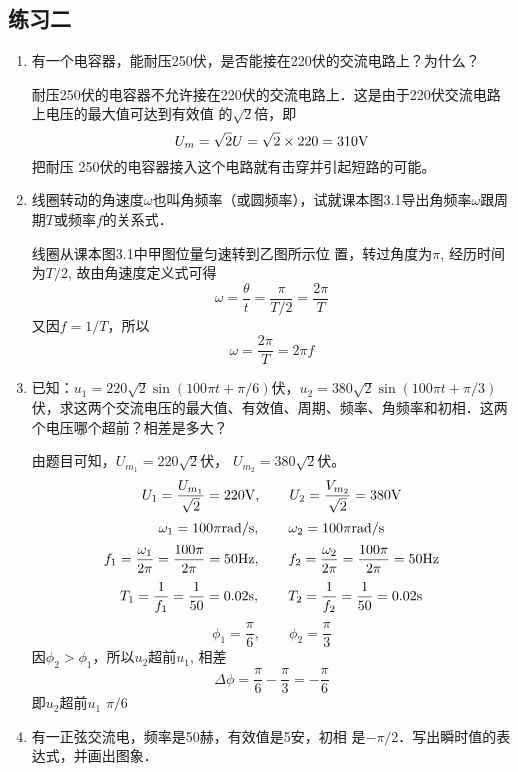 \subsection{练习二}
\begin{enumerate}
    \item 有一个电容器，能耐压250伏，是否能接在220伏的交流电路上？为什么？


    \begin{solution}
        耐压250伏的电容器不允许接在220伏的交流电路上．这是由于220伏交流电路上电压的最大值可达到有效值
        的$\sqrt{2}$倍，即
        \[U_m=\sqrt{2}U=\sqrt{2}\times220=310{\rm V}\]
        把耐压
        250伏的电容器接入这个电路就有击穿并引起短路的可能。
    \end{solution}
    
    \item 线圈转动的角速度$\omega$也叫角频率（或圆频率），试就课本图3.1导出角频率$\omega$跟周期$T$或频率$f$的关系式．


    \begin{solution}
        线圈从课本图3.1中甲图位量匀速转到乙图所示位
        置，转过角度为$\pi$, 经历时间为$T/2$, 故由角速度定义式可得
\[\omega=\frac{\theta}{t}=\frac{\pi}{T/2}=\frac{2\pi}{T}\]
又因$f=1/T$，所以
\[\omega=\frac{2\pi}{T}=2\pi f\]
    \end{solution}
    
    \item 已知：$u_1=220\sqrt{2}\sin(100\pi t+\pi /6)$伏，$u_2=380\sqrt{2}\sin(100\pi t+\pi /3)$伏，求这两个交流电压的最大值、有效值、周期、频率、角频率和初相．这两个电压哪个超前？相差是多大？


    \begin{solution}
        由题目可知，$U_{m_1}=220\sqrt{2}$伏，
        $U_{m_2}=380\sqrt{2}$伏。
\[        U_1=\frac{U_{m_1}}{\sqrt{2}}=220{\rm V},\qquad U_2=
 \frac{V_{m_2}}{\sqrt{2}}=380{\rm V}\]
    \[\omega_1=100\pi {\rm rad/s},\qquad \omega_2=100\pi {\rm rad/s}\]
\[f_1=\frac{\omega_1}{2\pi}=\frac{100\pi}{2\pi}=50{\rm Hz},\qquad f_2=\frac{\omega_2}{2\pi}=\frac{100\pi}{2\pi}=50{\rm Hz}\]
\[T_1=\frac{1}{f_1}=\frac{1}{50}=0.02{\rm s},\qquad T_2=\frac{1}{f_2}=\frac{1}{50}=0.02{\rm s}\]
\[\phi_1=\frac{\pi}{6},\qquad \phi_2=\frac{\pi}{3}\]
因$\phi_2>\phi_1$，所以$u_2$超前$u_1$, 相差
$$\Delta\phi=\frac{\pi}{6}-\frac{\pi}{3}=-\frac{\pi}{6}$$
即$u_2$超前$u_1$ $\pi/6$
    \end{solution}
    
    \item 有一正弦交流电，频率是50赫，有效值是5安，初相
    是$-\pi/2$．写出瞬时值的表达式，并画出图象．


\end{enumerate}
